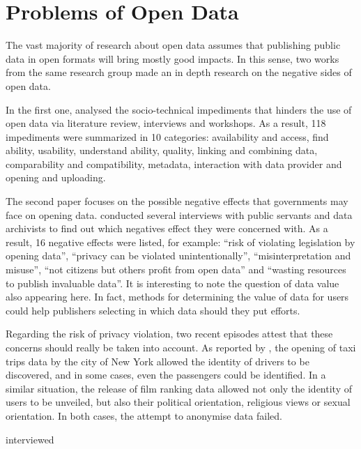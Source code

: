 
\section{Problems of Open Data}
\label{sec:problems}
\cite{Roseira2016}

The vast majority of research about open data assumes that publishing public data in open formats will bring mostly good impacts.
In this sense, two works from the same research group made an in depth research on the negative sides of open data.

In the first one,  analysed the socio-technical impediments that hinders the use of open data via literature review, interviews and workshops.
As a result, 118 impediments were summarized in 10 categories: availability and access, find ability, usability, understand ability, quality, linking and combining data, comparability and compatibility, metadata, interaction with data provider and opening and uploading.

The second paper focuses on the possible negative effects that governments may face on opening data.  conducted several interviews with public servants and data archivists to find out which negatives effect they were concerned with.
As a result, 16 negative effects were listed, for example: ``risk of violating legislation by opening data'', ``privacy can be violated unintentionally'', ``misinterpretation and misuse'', ``not citizens but others profit from open data'' and ``wasting resources to publish invaluable data''.
It is interesting to note the question of data value also appearing here.
In fact, methods for determining the value of data for users could help publishers selecting in which data should they put efforts.

Regarding the risk of privacy violation, two recent episodes attest that these concerns should really be taken into account.
As reported by , the opening of taxi trips data by the city of New York allowed the identity of drivers to be discovered, and in some cases, even the passengers could be identified.
In a similar situation, the release of film ranking data allowed not only the identity of users to be unveiled, but also their political orientation, religious views or sexual orientation.
In both cases, the attempt to anonymise data failed.

 interviewed 

